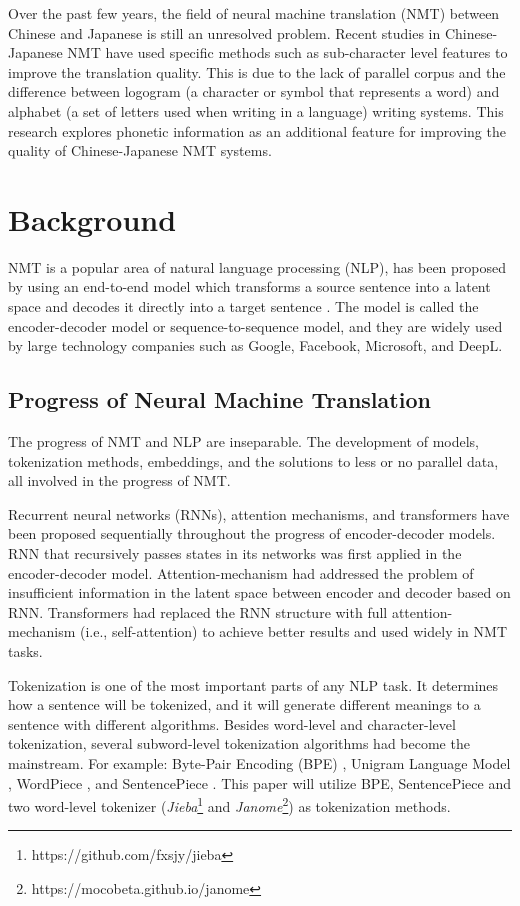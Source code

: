 \hspace{24pt}

Over the past few years, the field of neural machine translation (NMT) between Chinese and Japanese is still an unresolved problem. Recent studies in Chinese-Japanese NMT have used specific methods such as sub-character level features to improve the translation quality. This is due to the lack of parallel corpus and the difference between logogram (a character or symbol that represents a word) and alphabet (a set of letters used when writing in a language) writing systems. This research explores phonetic information as an additional feature for improving the quality of Chinese-Japanese NMT systems.

\section{Background} \label{sec:background}

NMT is a popular area of natural language processing (NLP), has been proposed by using an end-to-end model which transforms a source sentence into a latent space and decodes it directly into a target sentence \cite{sutskever2014sequence, cho2014learning}. The model is called the encoder-decoder model or sequence-to-sequence model, and they are widely used by large technology companies such as Google, Facebook, Microsoft, and DeepL.

\subsection{Progress of Neural Machine Translation} \label{sec:nmt}

The progress of NMT and NLP are inseparable. The development of models, tokenization methods, embeddings, and the solutions to less or no parallel data, all involved in the progress of NMT.

Recurrent neural networks (RNNs), attention mechanisms, and transformers have been proposed sequentially throughout the progress of encoder-decoder models. RNN that recursively passes states in its networks was first applied in the encoder-decoder model. Attention-mechanism had addressed the problem of insufficient information in the latent space between encoder and decoder based on RNN. Transformers had replaced the RNN structure with full attention-mechanism (i.e., self-attention) to achieve better results and used widely in NMT tasks. 

Tokenization is one of the most important parts of any NLP task. It determines how a sentence will be tokenized, and it will generate different meanings to a sentence with different algorithms. Besides word-level and character-level tokenization, several subword-level tokenization algorithms had become the mainstream. For example: Byte-Pair Encoding (BPE) \cite{sennrich_neural_2016}, Unigram Language Model \cite{kudo-2018-subword}, WordPiece \cite{6289079}, and SentencePiece \cite{kudo-richardson-2018-sentencepiece}. This paper will utilize BPE, SentencePiece \cite{sennrich_neural_2016, kudo-richardson-2018-sentencepiece} and two word-level tokenizer (\textit{Jieba}\footnote{https://github.com/fxsjy/jieba} and \textit{Janome}\footnote{https://mocobeta.github.io/janome}) as tokenization methods.

